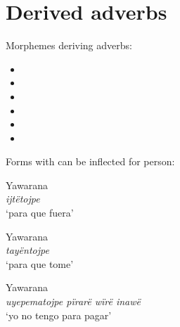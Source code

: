 \documentclass{memoir}
\begin{document}
\section{\texorpdfstring{Derived adverbs
\label{sec:derivedadv}}{Derived adverbs }}

Morphemes deriving adverbs:

\begin{itemize}
\item
\item
\item
\item
\item
\item
\end{itemize}

Forms with  can be inflected for person:

\ex Yawarana \\
\label{convestsjm-086}    \textit{ijtëtojpe }\\
        ‘para que fuera’ \xe

\ex Yawarana \\
\label{histpedgrme-163}    \textit{tayëntojpe }\\
        ‘para que tome’ \xe

\ex Yawarana \\
\label{histyarirdi-0875}    \textit{uyepematojpe pïrarë wïrë inawë }\\
        ‘yo no tengo para pagar’ \xe

\subsection{\texorpdfstring{}{}}
\end{document}
